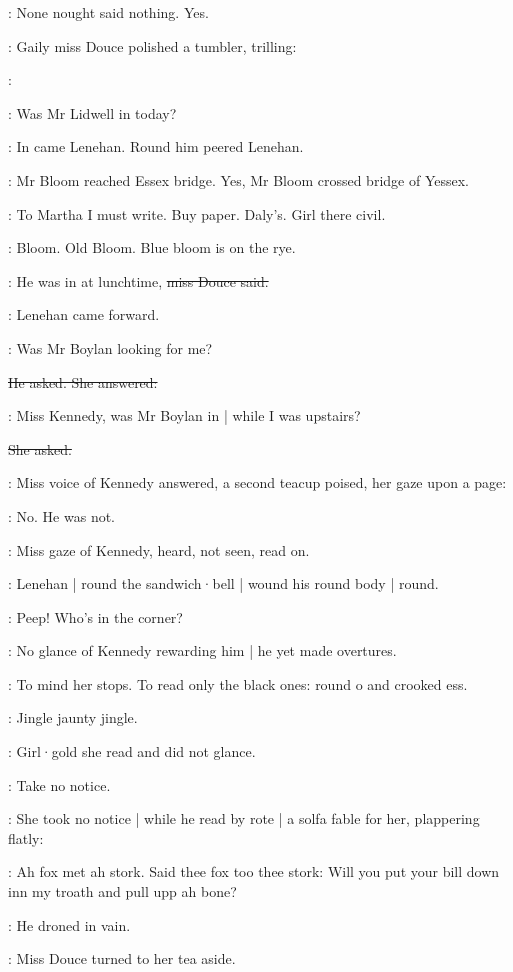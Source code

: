 :
None nought said nothing.
Yes.

:
Gaily miss Douce polished a tumbler,
trilling:

\MissD:

\lenehan:
Was Mr Lidwell in today?

:
In came Lenehan.
Round him peered Lenehan.

:
Mr Bloom reached Essex bridge.
Yes,
Mr Bloom crossed bridge of Yessex.

\BloomIntA:
To Martha I must write.
Buy paper.
Daly's.
Girl there civil.

:
Bloom.
Old Bloom.
Blue bloom is on the rye.

\MissD:
He was in at lunchtime,
\sout{miss Douce said.}

:
Lenehan came forward.

\lenehan:
Was Mr Boylan looking for me?

\sout{He asked.
She answered:}

\MissD:
Miss Kennedy,
was Mr Boylan in |
while I was upstairs?

\sout{She asked.}

:
Miss voice of Kennedy answered,
a second teacup poised,
her gaze upon a page:

\MissK:
No.
He was not.

:
Miss gaze of Kennedy,
heard,
not seen,
read on.

:
Lenehan |
round the sandwich·bell |
wound his round body |
round.

\lenehan:
Peep!
Who's in the corner?

:
No glance of Kennedy rewarding him |
he yet made overtures.

:
To mind her stops.
To read only the black ones:
round o and crooked ess.

:
Jingle jaunty jingle.

:
Girl·gold she read and did not glance.

\MissKInt:
Take no notice.

:
She took no notice |
while he read by rote |
a solfa fable for her,
plappering flatly:

\lenehan:
Ah fox met ah stork.
Said thee fox too thee stork:
Will you put your bill down inn my troath
and pull upp ah bone?

:
He droned in vain.

:
Miss Douce turned to her tea aside.

